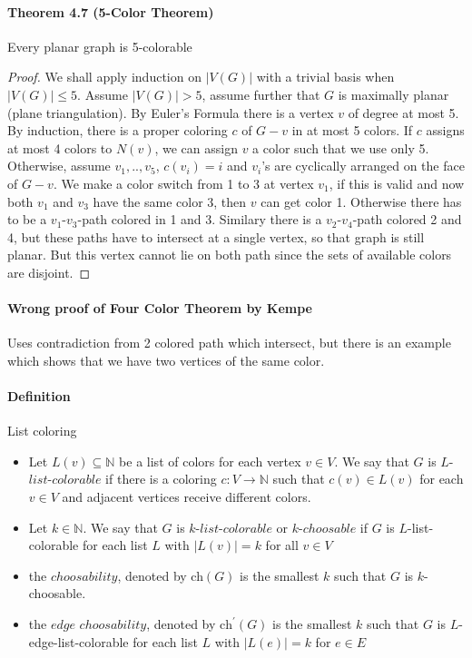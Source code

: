 \paragraph{Theorem 4.7 (5-Color Theorem)} Every planar graph is 5-colorable
\begin{proof}
    We shall apply induction on $|V(G)|$ with a trivial basis when 
    $|V(G)| \leq 5$. Assume $|V(G)| > 5$, assume further that $G$ is maximally
    planar (plane triangulation). By Euler's Formula there is a vertex $v$
    of degree at most 5. By induction, there is a proper coloring $c$ of 
    $G - v$ in at most 5 colors. If $c$ assigns at most 4 colors to $N(v)$,
    we can assign $v$ a color such that we use only 5.
    Otherwise, assume $v_1,..,v_5$, $c(v_i) = i$ and $v_i$'s are cyclically arranged on the face of 
    $G-v$. We make a color switch from 1 to 3 at vertex $v_1$, if this is valid 
    and now both $v_1$ and $v_3$ have the same color 3, then $v$ can get 
    color 1. Otherwise there has to be a $v_1$-$v_3$-path colored in 1 and 3.
    Similary there is a $v_2$-$v_4$-path colored 2 and 4, but these paths 
    have to intersect at a single vertex, so that graph is still planar. But 
    this vertex cannot lie on both path since the sets of available colors are 
    disjoint.
\end{proof}

\paragraph{Wrong proof of Four Color Theorem by Kempe}
Uses contradiction from 2 colored path which intersect, but there is an 
example which shows that we have two vertices of the same color.

\paragraph{Definition} List coloring
\begin{itemize}
    \item Let $L(v) \subseteq \mathbb{N}$ be a list of colors for each vertex 
    $v \in V$. We say that $ G $ is $L$-$list$-$colorable$ if there is a coloring
    $c: V \to \mathbb{N}$ such that $c(v) \in L(v)$ for each $v \in V$ and 
    adjacent vertices receive different colors. 
    \item Let $k \in \mathbb{N}$. We say that $G$ is $k$-$list$-$colorable$ or 
    $k$-$choosable$ if $G$ is $L$-list-colorable for each list $L$ with 
    $|L(v)| = k$ for all $v \in V$
    \item the $choosability$, denoted by ch$(G)$ is the smallest $k$ such that
    $G$ is $k$-choosable.
    \item the $edge$ $choosability$, denoted by $\text{ch}^\prime(G)$ is the 
    smallest $k$ such that $G$ is $L$-edge-list-colorable for each list
    $L$ with $|L(e)| = k$ for $e \in E$
\end{itemize}

